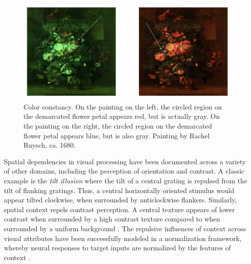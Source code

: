 \documentclass[a4paper, nobind]{templates/ociamthesis}
\begin{document}
\begin{figure}

{\centering \includegraphics[width=1\linewidth]{figures/intro-constancy} 

}

\caption[Color constancy]{Color constancy. On the painting on the left, the circled region on the demarcated flower petal appears red, but is actually gray. On the painting on the right, the circled region on the demarcated flower petal appears blue, but is also gray. Painting by Rachel Ruysch, ca. 1680.}\label{fig:intro-constancy}
\end{figure}

Spatial dependencies in visual processing have been documented across a variety of other domains, including the perception of orientation and contrast. A classic example is the \emph{tilt illusion} \autocite{blakemore1970} where the tilt of a central grating is repulsed from the tilt of flanking gratings. Thus, a central horizontally oriented stimulus would appear tilted clockwise, when surrounded by anticlockwise flankers. Similarly, spatial context repels contrast perception. A central texture appears of lower contrast when surrounded by a high contrast texture compared to when surrounded by a uniform background \autocite{chubb1989,xing2001}. The repulsive influences of context across visual attributes have been successfully modeled in a normalization framework, whereby neural responses to target inputs are normalized by the features of context \autocite{carandini2012}.
\end{document}
